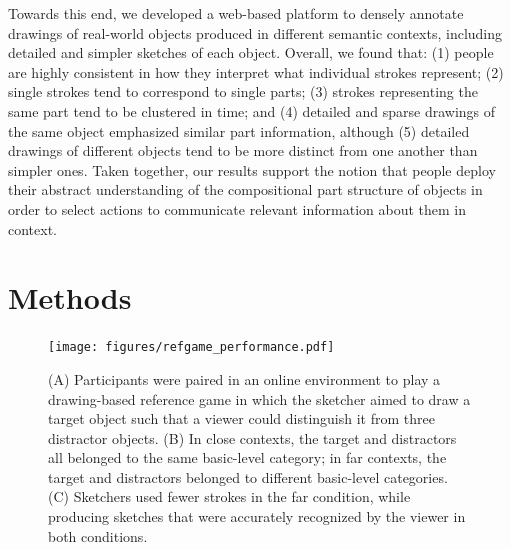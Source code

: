 \documentclass[10pt,letterpaper]{article}
\begin{document}
Towards this end, we developed a web-based platform to densely annotate drawings of real-world objects produced in different semantic contexts, including detailed and simpler sketches of each object. 
Overall, we found that: (1) people are highly consistent in how they interpret what individual strokes represent; (2) single strokes tend to correspond to single parts; (3) strokes representing the same part tend to be clustered in time; and (4) detailed and sparse drawings of the same object emphasized similar part information, although (5) detailed drawings of different objects tend to be more distinct from one another than simpler ones. 
Taken together, our results support the notion that people deploy their abstract understanding of the compositional part structure of objects in order to select actions to communicate relevant information about them in context. 

\section{Methods}

\begin{figure}[htbp]
\centering
\texttt{[image: figures/refgame\_performance.pdf]}
\caption{(A) Participants were paired in an online environment to play a drawing-based reference game in which the sketcher aimed to draw a target object such that a viewer could distinguish it from three distractor objects. (B) In close contexts, the target and distractors all belonged to the same basic-level category; in far contexts, the target and distractors belonged to different basic-level categories. (C) Sketchers used fewer strokes in the far condition, while producing sketches that were accurately recognized by the viewer in both conditions.}
\label{refgame_performance}
\end{figure}

\end{document}
